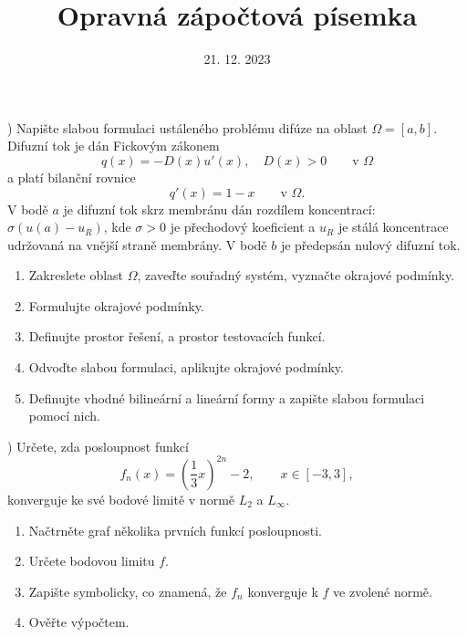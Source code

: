 \documentclass{article}
\begin{document}
\title{Opravná zápočtová písemka}
\date{21. 12. 2023}
\author{}
\maketitle


) \hspace{0.5cm}
Napište slabou formulaci ustáleného problému difúze na oblast $\Omega=[a,b]$.\\
Difuzní tok je dán Fickovým zákonem
\[
    q(x) = -D(x)u'(x), \quad D(x)>0 \qquad \textrm{v }\Omega
\]
a platí bilanční rovnice
\[
    q'(x) = 1-x \qquad \textrm{v }\Omega.
\]
\noindent
V bodě $a$ je difuzní tok skrz membránu dán rozdílem koncentrací: $\sigma(u(a)-u_R)$, kde
$\sigma>0$ je přechodový koeficient a $u_R$ je stálá koncentrace udržovaná na vnější straně membrány.
V bodě $b$ je předepsán nulový difuzní tok.

\begin{enumerate}
\item Zakreslete oblast $\Omega$, zaveďte souřadný systém, vyznačte okrajové podmínky.
\item Formulujte okrajové podmínky.
\item Definujte prostor řešení, a prostor testovacích funkcí.
\item Odvoďte slabou formulaci, aplikujte okrajové podmínky.
\item Definujte vhodné bilineární a lineární formy a zapište slabou formulaci pomocí nich.
\end{enumerate}


\vspace{1cm}

) \hspace{0.5cm}
Určete, zda posloupnost funkcí
\[
f_n(x) = \left( \frac{1}{3}x \right)^{2n}-2, \qquad x\in[-3,3],
\]
konverguje ke své bodové limitě v normě $L_2$ a $L_\infty$.


\begin{enumerate}
\item Načtrněte graf několika prvních funkcí posloupnosti.
\item Určete bodovou limitu $f$.
\item Zapište symbolicky, co znamená, že $f_n$ konverguje k $f$ ve zvolené normě.
\item Ověřte výpočtem.
\end{enumerate}
\end{document}
